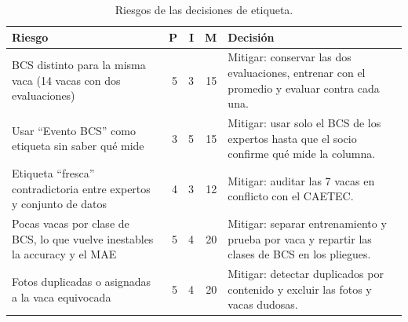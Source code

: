 \begin{table}[H]
  \centering
  \small
  \caption{Riesgos de las decisiones de etiqueta.}
  \label{tab:riesgos}
  \begin{tabularx}{\textwidth}{>{\raggedright\arraybackslash}p{}rrr>{\raggedright\arraybackslash}X}
    \toprule
    Riesgo & P & I & M & Decisión \\
    \midrule
    BCS distinto para la misma vaca (14 vacas con dos evaluaciones) & 5 & 3 & 15 & Mitigar: conservar las dos evaluaciones, entrenar con el promedio y evaluar contra cada una. \\
    \addlinespace
    Usar ``Evento BCS'' como etiqueta sin saber qué mide & 3 & 5 & 15 & Mitigar: usar solo el BCS de los expertos hasta que el socio confirme qué mide la columna. \\
    \addlinespace
    Etiqueta ``fresca'' contradictoria entre expertos y conjunto de datos & 4 & 3 & 12 & Mitigar: auditar las 7 vacas en conflicto con el CAETEC. \\
    \addlinespace
    Pocas vacas por clase de BCS, lo que vuelve inestables la accuracy y el MAE & 5 & 4 & 20 & Mitigar: separar entrenamiento y prueba por vaca y repartir las clases de BCS en los pliegues. \\
    \addlinespace
    Fotos duplicadas o asignadas a la vaca equivocada & 5 & 4 & 20 & Mitigar: detectar duplicados por contenido y excluir las fotos y vacas dudosas. \\
    \bottomrule
  \end{tabularx}
\end{table}
